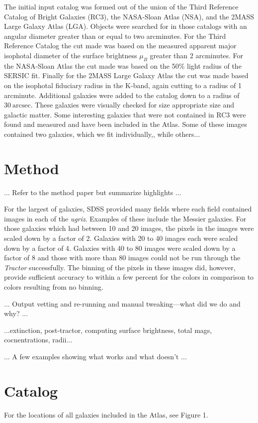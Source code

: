 \documentclass[12pt,preprint,dvipdf]{aastex}
\newcommand{\units}[1]{\mathrm{#1}}
\renewcommand{\arcsec}{\units{arcsec}}
\begin{document}
The initial input catalog was formed out of the union of the Third Reference Catalog of Bright Galaxies (RC3), the NASA-Sloan Atlas (NSA), and the 2MASS Large Galaxy Atlas (LGA). Objects were searched for in those catalogs with an angular diameter greater than or equal to two arcminutes. For the Third Reference Catalog the cut made was based on the measured apparent major isophotal diameter of the surface brightness $\mu_{B}$ greater than 2 arcminutes. For the NASA-Sloan Atlas the cut made was based on the 50\% light radius of the SERSIC fit. Finally for the 2MASS Large Galaxy Atlas the cut was made based on the isophotal fiduciary radius in the K-band, again cutting to a radius of 1 arcminute. Additional galaxies were added to the catalog down to a radius of $30~\arcsec$. These galaxies were visually checked for size appropriate size and galactic matter. Some interesting galaxies that were not contained in RC3 were found and measured and have been included in the Atlas. Some of these images contained two galaxies, which we fit individually,, while others...

\section{Method}

... Refer to the method paper but summarize highlights ...


For the largest of galaxies, SDSS provided many fields where each field contained images in each of the \textit{ugriz}. Examples of these include the Messier galaxies. For those galaxies which had between 10 and 20 images, the pixels in the images were scaled down by a factor of 2. Galaxies with 20 to 40 images each were scaled down by a factor of 4. Galaxies with 40 to 80 images were scaled down by a factor of 8 and those with more than 80 images could not be run through the \textit{Tractor} successfully. The binning of the pixels in these images did, however, provide sufficient accuracy to within a few percent for the colors in comparison to colors resulting from no binning. 

... Output vetting and re-running and manual tweaking---what did we do and why? ...

...extinction, post-tractor, computing surface brightness, total mags, cocnentrations, radii...

... A few examples showing what works and what doesn't ...

\section{Catalog}
For the locations of all galaxies included in the Atlas, see Figure 1. 
\end{document}
